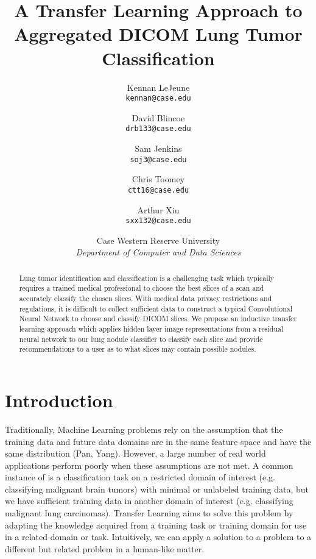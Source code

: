 \documentclass[10pt,twocolumn,letterpaper]{article}
\begin{document}
\title{A Transfer Learning Approach to Aggregated DICOM Lung Tumor Classification}

\author{Kennan LeJeune\\
   {\tt\small kennan@case.edu}
   \and
   David Blincoe\\
   {\tt\small drb133@case.edu}
   \and
   Sam Jenkins\\
   {\tt\small soj3@case.edu}
   \and
   Chris Toomey\\
   {\tt\small ctt16@case.edu}
   \and
   Arthur Xin\\
   {\tt\small sxx132@case.edu}\\
   \and
   {Case Western Reserve University}\\
   {\textit{Department of Computer and Data Sciences}}
}
\maketitle

\begin{abstract}
   Lung tumor identification and classification is a challenging task which typically requires a trained medical
   professional to choose the best slices of a scan and accurately classify the chosen slices. With medical data privacy restrictions
   and regulations, it is difficult to collect sufficient data to construct a typical Convolutional Neural Network to
   choose and classify DICOM slices. We propose an inductive transfer learning approach which applies hidden layer
   image representations from a residual neural network to our lung nodule classifier to classify each slice and provide
   recommendations to a user as to what slices may contain possible nodules.
\end{abstract}

\section{Introduction} \label{sec:intro}

   Traditionally, Machine Learning problems rely on the assumption that the training data and future data domains
   are in the same feature space and have the same distribution (Pan, Yang). However, a large number of real world
   applications perform poorly when these assumptions are not met. A common instance of is a classification task on
   a restricted domain of interest (e.g. classifying malignant brain tumors) with minimal or unlabeled training data,
   but we have sufficient training data in another domain of interest (e.g. classifying malignant lung carcinomas).
   Transfer Learning aims to solve this problem by adapting the knowledge acquired from a training task or
   training domain for use in a related domain or task. Intuitively, we can apply a solution to a problem to a
   different but related problem in a human-like matter.
\end{document}
